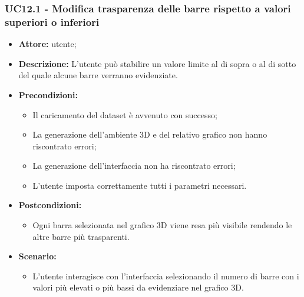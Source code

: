 \subsubsection{UC12.1 - Modifica trasparenza delle barre rispetto a valori superiori o inferiori}
\begin{itemize}    
    \item \textbf{Attore:} utente;
    \item \textbf{Descrizione:} L'utente può stabilire un valore limite al di sopra o al di sotto del quale alcune barre verranno evidenziate.
    \item \textbf{Precondizioni:}    
        \begin{itemize}
            \item Il caricamento del dataset è avvenuto con successo;
            \item La generazione dell'ambiente 3D e del relativo grafico non hanno riscontrato errori;
            \item La generazione dell'interfaccia non ha riscontrato errori;
            \item L'utente imposta correttamente tutti i parametri necessari.
        \end{itemize}    
    \item \textbf{Postcondizioni:}
        \begin{itemize}
            \item Ogni barra selezionata nel grafico 3D viene resa più visibile rendendo le altre barre più trasparenti.
        \end{itemize}    
    \item \textbf{Scenario:} 
        \begin{itemize}
            \item L'utente interagisce con l'interfaccia selezionando il numero di barre con i valori più elevati o più bassi da evidenziare nel grafico 3D.
        \end{itemize}
\end{itemize}
